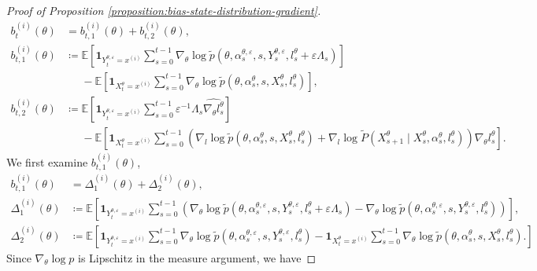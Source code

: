 \documentclass[11pt]{article}
\numberwithin{equation}{section}
\theoremstyle{definition}
\theoremstyle{remark}
\def\eps{\varepsilon}
\begin{document}
\begin{proof}[Proof of Proposition \ref{proposition:bias-state-distribution-gradient}]
\begin{equation}
\begin{aligned}
    b_t^{(i)}(\theta) &= b_{t,1}^{(i)}(\theta) + b_{t,2}^{(i)}(\theta),\\
    b_{t,1}^{(i)}(\theta) & \coloneq \mathbb E \left[ 
         \mathbf 1_{Y_t^{\theta, \eps} = x^{(i)}} \sum_{s = 0}^{t-1}
            \nabla_\theta \log \tilde p (\theta, \alpha_s^{\theta, \eps}, s,Y_s^{\theta, \eps}, l_s^{\theta} + \eps \Lambda_s) \right] \\
            & \quad \:\:- \mathbb E \left[ \mathbf 1_{X_t^{\theta} = x^{(i)}} \sum_{s = 0}^{t-1} 
            \nabla_\theta \log \tilde p (\theta, \alpha_s^{\theta}, s,X_s^{\theta}, l_s^{\theta}) 
    \right], \\
    b_{t,2}^{(i)}(\theta) & \coloneq \mathbb E \left[ 
        \mathbf 1_{Y_t^{\theta, \eps} = x^{(i)}} \sum_{s = 0}^{t-1} 
            \eps^{-1} \Lambda_s \widehat{\nabla_\theta l_s^\theta}  \right] \\
       & \quad \:\: - \mathbb E \left[ \mathbf 1_{X_t^{\theta} = x^{(i)}} \sum_{s = 0}^{t-1} \left(
            \nabla_l \log \tilde p(\theta, \alpha_s^\theta, s,X_s^\theta, l_s^\theta) + \nabla_l \log \tilde P(X_{s + 1}^\theta \mid X_s^\theta, \alpha_s^\theta, l_s^\theta)
            \right) \nabla_\theta l_s^\theta
    \right].
\end{aligned}
\end{equation}
We first examine $b_{t,1}^{(i)}(\theta)$,
\[
\begin{aligned}
    b_{t,1}^{(i)}(\theta) & = \Delta_1^{(i)}(\theta) + \Delta_2^{(i)}(\theta), \\
     \Delta_1^{(i)}(\theta) & \coloneq \mathbb E \left[
        \mathbf 1_{Y_t^{\theta, \eps} = x^{(i)}} \sum_{s = 0}^{t-1}  \left(
        \nabla_\theta \log \tilde p (\theta, \alpha_s^{\theta, \eps},s, Y_s^{\theta, \eps}, l_s^{\theta} + \eps \Lambda_s)
        - \nabla_\theta \log \tilde p (\theta, \alpha_s^{\theta, \eps},s, Y_s^{\theta, \eps}, l_s^{\theta}) \right) \right], \\
        \Delta_2^{(i)}(\theta) & \coloneq \mathbb E \left[
        \mathbf 1_{Y_t^{\theta, \eps} = x^{(i)}} \sum_{s = 0}^{t-1}
            \nabla_\theta \log \tilde p (\theta, \alpha_s^{\theta, \eps}, s,Y_s^{\theta, \eps}, l_s^{\theta}) 
            - \mathbf 1_{X_t^{\theta} = x^{(i)}} \sum_{s = 0}^{t-1}
            \nabla_\theta \log \tilde p (\theta, \alpha_s^{\theta}, s,X_s^{\theta}, l_s^{\theta}).
        \right]
\end{aligned}
\]
Since $\nabla_\theta \log p$ is Lipschitz in the measure argument, we have 

\end{proof}
\end{document}
